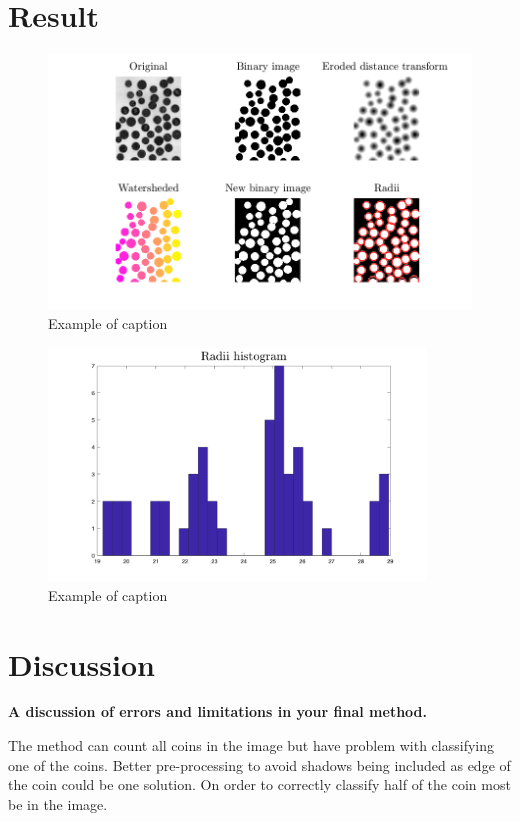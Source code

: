 \documentclass[oneside,a4paper]{article}
\begin{document}
\newpage 

\section{Result}

\begin{figure}[ht!]
\centering
\includegraphics[width=130mm]{figures/assign_3.png}
\caption{Example of caption}
\label{fig:workprocess}
\end{figure}

\begin{figure}[ht!]
\centering
\includegraphics[width=100mm]{figures/assign_3b.png}
\caption{Example of caption}
\label{fig:result}
\end{figure}


\section{Discussion}

\noindent \textbf{A discussion of errors and limitations in your final method.}

The method can count all coins in the image but have problem with classifying one of the coins. Better pre-processing to avoid shadows being included as edge of the coin could be one solution. On order to correctly classify half of the coin most be in the image. 
\end{document}
